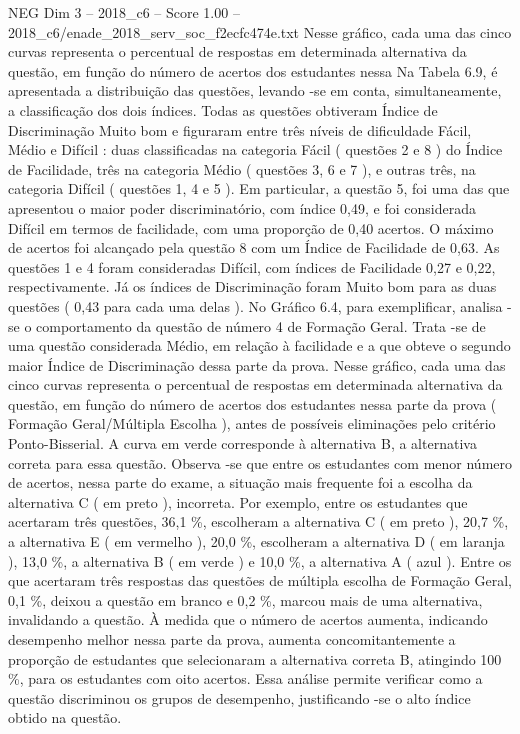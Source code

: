 \begin{textsample}{NEG Dim 3 – 2018\_c6 – Score 1.00 – 2018\_c6/enade\_2018\_serv\_soc\_f2ecfc474e.txt}
Nesse gráfico, cada uma das cinco curvas representa o percentual de respostas em determinada alternativa da questão, em função do número de acertos dos estudantes nessa Na Tabela 6.9, é apresentada a distribuição das questões, levando -se em conta, simultaneamente, a classificação dos dois índices.
Todas as questões obtiveram Índice de Discriminação Muito bom e figuraram entre três níveis de dificuldade Fácil, Médio e Difícil : duas classificadas na categoria Fácil ( questões 2 e 8 ) do Índice de Facilidade, três na categoria Médio ( questões 3, 6 e 7 ), e outras três, na categoria Difícil ( questões 1, 4 e 5 ).
Em particular, a questão 5, foi uma das que apresentou o maior poder discriminatório, com índice 0,49, e foi considerada Difícil em termos de facilidade, com uma proporção de 0,40 acertos.
O máximo de acertos foi alcançado pela questão 8 com um Índice de Facilidade de 0,63.
As questões 1 e 4 foram consideradas Difícil, com índices de Facilidade 0,27 e 0,22, respectivamente.
Já os índices de Discriminação foram Muito bom para as duas questões ( 0,43 para cada uma delas ).
No Gráfico 6.4, para exemplificar, analisa -se o comportamento da questão de número 4 de Formação Geral.
Trata -se de uma questão considerada Médio, em relação à facilidade e a que obteve o segundo maior Índice de Discriminação dessa parte da prova.
Nesse gráfico, cada uma das cinco curvas representa o percentual de respostas em determinada alternativa da questão, em função do número de acertos dos estudantes nessa parte da prova ( Formação Geral/Múltipla Escolha ), antes de possíveis eliminações pelo critério Ponto-Bisserial.
A curva em verde corresponde à alternativa B, a alternativa correta para essa questão.
Observa -se que entre os estudantes com menor número de acertos, nessa parte do exame, a situação mais frequente foi a escolha da alternativa C ( em preto ), incorreta.
Por exemplo, entre os estudantes que acertaram três questões, 36,1 \%, escolheram a alternativa C ( em preto ), 20,7 \%, a alternativa E ( em vermelho ), 20,0 \%, escolheram a alternativa D ( em laranja ), 13,0 \%, a alternativa B ( em verde ) e 10,0 \%, a alternativa A ( azul ).
Entre os que acertaram três respostas das questões de múltipla escolha de Formação Geral, 0,1 \%, deixou a questão em branco e 0,2 \%, marcou mais de uma alternativa, invalidando a questão.
À medida que o número de acertos aumenta, indicando desempenho melhor nessa parte da prova, aumenta concomitantemente a proporção de estudantes que selecionaram a alternativa correta B, atingindo 100 \%, para os estudantes com oito acertos.
Essa análise permite verificar como a questão discriminou os grupos de desempenho, justificando -se o alto índice obtido na questão.

\end{textsample}
